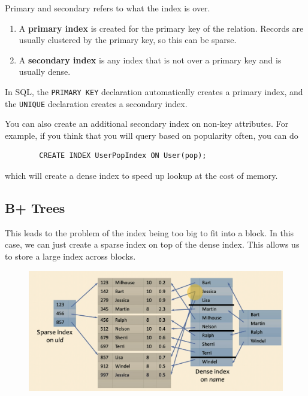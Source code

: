 \documentclass{article}
\begin{document}
    \begin{definition}
      Primary and secondary refers to what the index is over. 
      \begin{enumerate}
        \item A \textbf{primary index} is created for the primary key of the relation. Records are usually clustered by the primary key, so this can be sparse. 
        \item A \textbf{secondary index} is any index that is not over a primary key and is usually dense. 
      \end{enumerate}
      In SQL, the \texttt{PRIMARY KEY} declaration automatically creates a primary index, and the \texttt{UNIQUE} declaration creates a secondary index. 
    \end{definition}

    \begin{example}
      You can also create an additional secondary index on non-key attributes. For example, if you think that you will query based on popularity often, you can do 
      \begin{lstlisting}
        CREATE INDEX UserPopIndex ON User(pop); 
      \end{lstlisting}
      which will create a dense index to speed up lookup at the cost of memory. 
    \end{example}

  \subsection{B+ Trees}

    This leads to the problem of the index being too big to fit into a block. In this case, we can just create a sparse index on top of the dense index. This allows us to store a large index across blocks. 
    
    \begin{figure}[H]
      \centering 
      \includegraphics[scale=0.4]{img/too_big.png}
      \caption{} 
      \label{fig:too_big}
    \end{figure}
\end{document}
